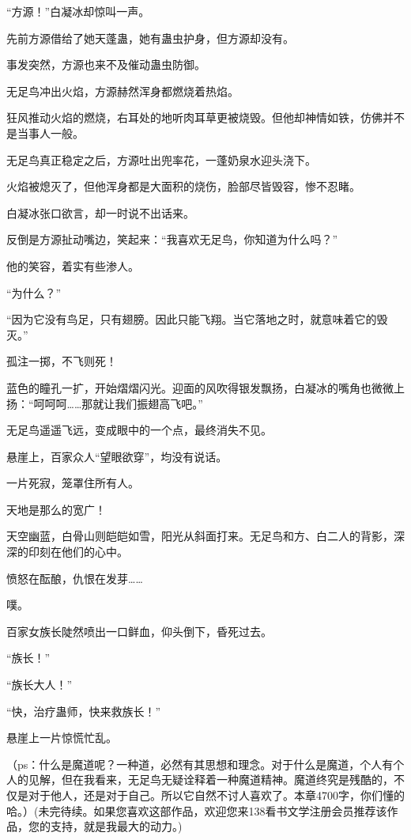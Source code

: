 \begin{this_body}
“方源！”白凝冰却惊叫一声。

先前方源借给了她天蓬蛊，她有蛊虫护身，但方源却没有。

事发突然，方源也来不及催动蛊虫防御。

无足鸟冲出火焰，方源赫然浑身都燃烧着热焰。

狂风推动火焰的燃烧，右耳处的地听肉耳草更被烧毁。但他却神情如铁，仿佛并不是当事人一般。

无足鸟真正稳定之后，方源吐出兜率花，一蓬奶泉水迎头浇下。

火焰被熄灭了，但他浑身都是大面积的烧伤，脸部尽皆毁容，惨不忍睹。

白凝冰张口欲言，却一时说不出话来。

反倒是方源扯动嘴边，笑起来：“我喜欢无足鸟，你知道为什么吗？”

他的笑容，着实有些渗人。

“为什么？”

“因为它没有鸟足，只有翅膀。因此只能飞翔。当它落地之时，就意味着它的毁灭。”

孤注一掷，不飞则死！

蓝色的瞳孔一扩，开始熠熠闪光。迎面的风吹得银发飘扬，白凝冰的嘴角也微微上扬：“呵呵呵……那就让我们振翅高飞吧。”

无足鸟遥遥飞远，变成眼中的一个点，最终消失不见。

悬崖上，百家众人“望眼欲穿”，均没有说话。

一片死寂，笼罩住所有人。

天地是那么的宽广！

天空幽蓝，白骨山则皑皑如雪，阳光从斜面打来。无足鸟和方、白二人的背影，深深的印刻在他们的心中。

愤怒在酝酿，仇恨在发芽……

噗。

百家女族长陡然喷出一口鲜血，仰头倒下，昏死过去。

“族长！”

“族长大人！”

“快，治疗蛊师，快来救族长！”

悬崖上一片惊慌忙乱。

（ps：什么是魔道呢？一种道，必然有其思想和理念。对于什么是魔道，个人有个人的见解，但在我看来，无足鸟无疑诠释着一种魔道精神。魔道终究是残酷的，不仅是对于他人，还是对于自己。所以它自然不讨人喜欢了。本章4700字，你们懂的哈。）(未完待续。如果您喜欢这部作品，欢迎您来138看书文学注册会员推荐该作品，您的支持，就是我最大的动力。)

\end{this_body}

